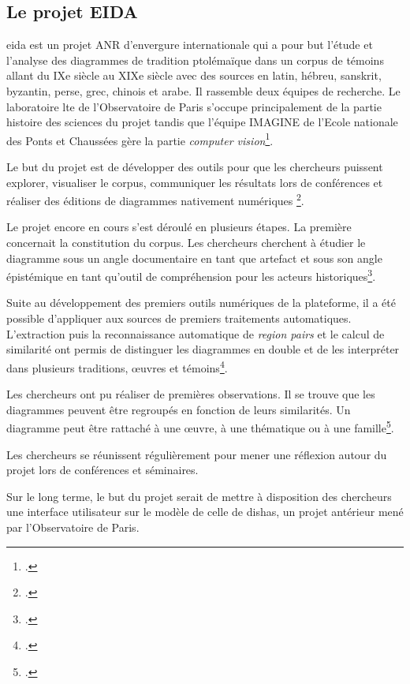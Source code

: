 \subsection{Le projet EIDA}

\gls{eida} est un projet ANR d'envergure internationale qui a pour but l'étude et l'analyse des diagrammes de tradition ptolémaïque dans un corpus de témoins allant du IXe siècle au XIXe siècle avec des sources en latin, hébreu, sanskrit, byzantin, perse, grec, chinois et arabe. Il rassemble deux équipes de recherche. Le laboratoire \gls{lte} de l'Observatoire de Paris s'occupe principalement de la partie histoire des sciences du projet tandis que l'équipe IMAGINE de l'Ecole nationale des Ponts et Chaussées gère la partie \textit{computer vision}\footcite{albouyAIKONComputerVision}. 

Le but du projet est de développer des outils pour que les chercheurs puissent explorer, visualiser le corpus, communiquer les résultats lors de conférences et réaliser des éditions de diagrammes nativement numériques \footcite{Conference2023EIDA2023}.

Le projet encore en cours s'est déroulé en plusieurs étapes. La première concernait la constitution du corpus. Les chercheurs cherchent à étudier le diagramme sous un angle documentaire en tant que artefact et sous son angle épistémique en tant qu'outil de compréhension pour les acteurs historiques\footcite{Conference2023EIDA2023}.

Suite au développement des premiers outils numériques de la plateforme, il a été possible d'appliquer aux sources de premiers traitements automatiques. L'extraction puis la reconnaissance automatique de \textit{region pairs} et le calcul de similarité ont permis de distinguer les diagrammes en double et de les interpréter dans plusieurs traditions, œuvres et témoins\footcite{Conference2024Graphic2024}.

Les chercheurs ont pu réaliser de premières observations. Il se trouve que les diagrammes peuvent être regroupés en fonction de leurs similarités. Un diagramme peut être rattaché à une œuvre, à une thématique ou à une famille\footcite{Conference2025Long2025}. 

Les chercheurs se réunissent régulièrement pour mener une réflexion autour du projet lors de conférences et séminaires. 
 

Sur le long terme, le but du projet serait de mettre à disposition des chercheurs une interface utilisateur sur le modèle de celle de \gls{dishas}, un projet antérieur mené par l'Observatoire de Paris. \\

